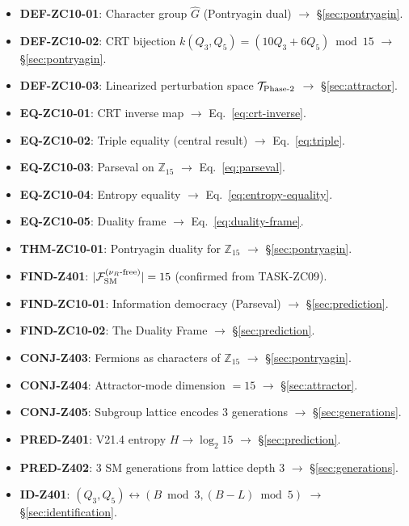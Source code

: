 \documentclass[12pt, a4paper]{article}
\begin{document}
\begin{formalbox}[title={Atomic units introduced by TASK-ZC10}]
\begin{itemize}[leftmargin=*]
  \item \textbf{DEF-ZC10-01}: Character group $\hat{G}$
    (Pontryagin dual) $\to$ \S\ref{sec:pontryagin}.
  \item \textbf{DEF-ZC10-02}: CRT bijection
    $k(Q_3,Q_5) = (10Q_3+6Q_5)\bmod 15$
    $\to$ \S\ref{sec:pontryagin}.
  \item \textbf{DEF-ZC10-03}: Linearized perturbation space
    $\mathcal{T}_{\rm Phase\text{-}2}$
    $\to$ \S\ref{sec:attractor}.
  \item \textbf{EQ-ZC10-01}: CRT inverse map
    $\to$ Eq.~\eqref{eq:crt-inverse}.
  \item \textbf{EQ-ZC10-02}: Triple equality (central result)
    $\to$ Eq.~\eqref{eq:triple}.
  \item \textbf{EQ-ZC10-03}: Parseval on $\mathbb{Z}_{15}$
    $\to$ Eq.~\eqref{eq:parseval}.
  \item \textbf{EQ-ZC10-04}: Entropy equality
    $\to$ Eq.~\eqref{eq:entropy-equality}.
  \item \textbf{EQ-ZC10-05}: Duality frame
    $\to$ Eq.~\eqref{eq:duality-frame}.
  \item \textbf{THM-ZC10-01}: Pontryagin duality for $\mathbb{Z}_{15}$
    $\to$ \S\ref{sec:pontryagin}.
  \item \textbf{FIND-Z401}: $|\mathcal{F}_{\rm SM}^{(\nu_R\text{-free})}|=15$
    (confirmed from TASK-ZC09).
  \item \textbf{FIND-ZC10-01}: Information democracy (Parseval)
    $\to$ \S\ref{sec:prediction}.
  \item \textbf{FIND-ZC10-02}: The Duality Frame
    $\to$ \S\ref{sec:prediction}.
  \item \textbf{CONJ-Z403}: Fermions as characters of $\mathbb{Z}_{15}$
    $\to$ \S\ref{sec:pontryagin}.
  \item \textbf{CONJ-Z404}: Attractor-mode dimension $=15$
    $\to$ \S\ref{sec:attractor}.
  \item \textbf{CONJ-Z405}: Subgroup lattice encodes 3 generations
    $\to$ \S\ref{sec:generations}.
  \item \textbf{PRED-Z401}: V21.4 entropy $H \to \log_2 15$
    $\to$ \S\ref{sec:prediction}.
  \item \textbf{PRED-Z402}: 3 SM generations from lattice depth 3
    $\to$ \S\ref{sec:generations}.
  \item \textbf{ID-Z401}: $(Q_3, Q_5) \leftrightarrow (B\bmod3, (B-L)\bmod5)$
    $\to$ \S\ref{sec:identification}.
\end{itemize}
\end{formalbox}
\end{document}
